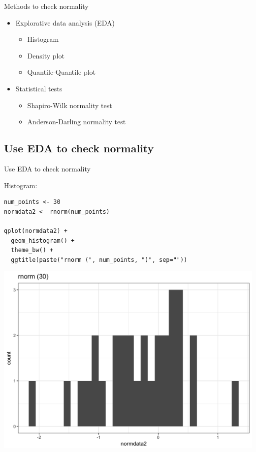 \documentclass[12pt, t, xcolor=dvipsnames]{beamer}
\begin{document}
\begin{frame}{Methods to check normality}

\begin{itemize}
  \item Explorative data analysis (EDA)
  \begin{itemize}
    \item Histogram
    \item Density plot
    \item Quantile-Quantile plot
  \end{itemize}
  \item Statistical tests
  \begin{itemize}
    \item Shapiro-Wilk normality test
    \item Anderson-Darling normality test
  \end{itemize}
\end{itemize}

\end{frame}

\subsection{Use EDA to check normality}

\begin{frame}[fragile]{Use EDA to check normality}

Histogram: 

\begin{verbatim}
num_points <- 30
normdata2 <- rnorm(num_points)

qplot(normdata2) + 
  geom_histogram() + 
  theme_bw() + 
  ggtitle(paste("rnorm (", num_points, ")", sep=""))
\end{verbatim}

\includegraphics[height=0.4\textheight, keepaspectratio]{edahist}

\end{frame}
\end{document}
